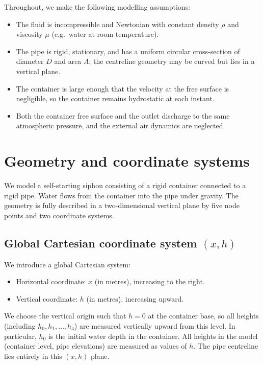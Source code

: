 \documentclass[11pt]{article}
\begin{document}
Throughout, we make the following modelling assumptions:
\begin{itemize}
  \item The fluid is incompressible and Newtonian with constant density $\rho$ and viscosity
        $\mu$ (e.g.\ water at room temperature).
  \item The pipe is rigid, stationary, and has a uniform circular cross-section of diameter $D$
        and area $A$; the centreline geometry may be curved but lies in a vertical plane.
  \item The container is large enough that the velocity at the free surface is negligible, so the
        container remains hydrostatic at each instant.
  \item Both the container free surface and the outlet discharge to the same atmospheric pressure,
        and the external air dynamics are neglected.
\end{itemize}

\section{Geometry and coordinate systems}
\label{sec:geometry}

We model a self-starting siphon consisting of a rigid container connected to a rigid pipe.
Water flows from the container into the pipe under gravity. The geometry is fully described
in a two-dimensional vertical plane by five node points and two coordinate systems.

\subsection{Global Cartesian coordinate system $(x,h)$}

We introduce a global Cartesian system:
\begin{itemize}
  \item Horizontal coordinate: $x$ (in metres), increasing to the right.
  \item Vertical coordinate: $h$ (in metres), increasing upward.
\end{itemize}
We choose the vertical origin such that $h=0$ at the container base, so all heights (including $h_0,h_1,\dots,h_4$) are measured vertically upward from this level. In particular, $h_0$ is the initial water depth in the container.
All heights in the model (container level, pipe elevations) are measured as values of $h$.
The pipe centreline lies entirely in this $(x,h)$ plane.
\end{document}
